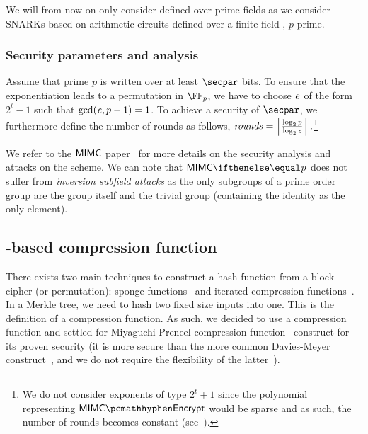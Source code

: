 We will from now on only consider \mimc{} defined over prime fields as we consider SNARKs based on arithmetic circuits defined over a finite field , $p$ prime.

\subsubsection{Security parameters and analysis}\label{instantiation:mkhash:mimc-encryption:security}

Assume that prime $p$ is written over at least $\secpar$ bits. To ensure that the exponentiation leads to a permutation in $\FFx{p}$, we have to choose $\mathit{e}{}$ of the form $2^t-1$ such that $\gcd(\mathit{e}{}, p-1) = 1$. To achieve a security of $\secpar$, we furthermore define the number of rounds as follows, $\mathit{rounds} = \left\lceil \frac{\log_2 p}{\log_2 \mathit{e}{}} \right\rceil. $\footnote{We do not consider exponents of type $2^t+1$ since the polynomial representing $\mimcEnc$ would be sparse and as such, the number of rounds becomes constant (see~\cite[Section 5.3]{albrecht2016mimc}).}

We refer to the $\mathsf{MIMC{}}$ paper~\cite[Section 4.2 and 5.1]{albrecht2016mimc} for more details on the security analysis and attacks on the scheme. We can note that $\mimcPrime{p}$ does not suffer from \emph{inversion subfield attacks} as the only subgroups of a prime order group are the group itself and the trivial group (containing the identity as the only element).

\subsection{\mimc{}-based compression function}\label{instantiation:mkhash:mimc-compressionf}

There exists two main techniques to construct a hash function from a block-cipher (or permutation): sponge functions~\cite{bertoni2007sponge} and iterated compression functions~\cite{black2002black}.
In a Merkle tree, we need to hash two fixed size inputs into one. This is the definition of a compression function. As such, we decided to use a compression function and settled for Miyaguchi-Preneel compression function~\cite[$f_3$ function]{black2002black} construct for its proven security (it is more secure than the more common Davies-Meyer construct~\cite[$f_5$ function]{black2002black}, and we do not require the flexibility of the latter~\cite[Section 3]{gazzoni2006maelstrom}).

